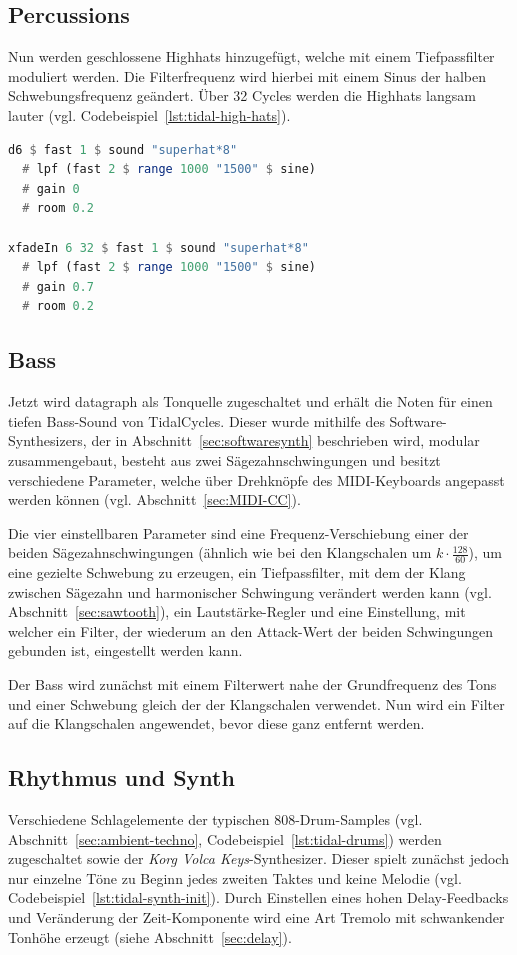 \subsection{Percussions}
Nun werden geschlossene Highhats hinzugefügt, welche mit einem Tiefpassfilter moduliert werden. Die Filterfrequenz wird hierbei mit einem Sinus der halben Schwebungsfrequenz geändert. Über 32 Cycles werden die Highhats langsam lauter (vgl. Codebeispiel~\ref{lst:tidal-high-hats}).

\begin{lstlisting}[language=Haskell, caption={fadeIn der Highhats}, label={lst:tidal-high-hats}]
d6 $ fast 1 $ sound "superhat*8" 
  # lpf (fast 2 $ range 1000 "1500" $ sine)
  # gain 0
  # room 0.2

xfadeIn 6 32 $ fast 1 $ sound "superhat*8" 
  # lpf (fast 2 $ range 1000 "1500" $ sine)
  # gain 0.7
  # room 0.2
\end{lstlisting}

\subsection{Bass}
Jetzt wird datagraph als Tonquelle zugeschaltet und erhält die Noten für einen tiefen Bass-Sound von TidalCycles. Dieser wurde mithilfe des Software-Synthesizers, der in Abschnitt~\ref{sec:softwaresynth} beschrieben wird, modular zusammengebaut, besteht aus zwei Sägezahnschwingungen und besitzt verschiedene Parameter, welche über Drehknöpfe des MIDI-Keyboards angepasst werden können (vgl. Abschnitt~\ref{sec:MIDI-CC}).

Die vier einstellbaren Parameter sind eine Frequenz-Verschiebung einer der beiden Sägezahnschwingungen (ähnlich wie bei den Klangschalen um $k \cdot \frac{128}{60}$), um eine gezielte Schwebung zu erzeugen, ein Tiefpassfilter, mit dem der Klang zwischen Sägezahn und harmonischer Schwingung verändert werden kann (vgl. Abschnitt~\ref{sec:sawtooth}), ein Lautstärke-Regler und eine Einstellung, mit welcher ein Filter, der wiederum an den Attack-Wert der beiden Schwingungen gebunden ist, eingestellt werden kann.

Der Bass wird zunächst mit einem Filterwert nahe der Grundfrequenz des Tons und einer Schwebung gleich der der Klangschalen verwendet. Nun wird ein Filter auf die Klangschalen angewendet, bevor diese ganz entfernt werden.

\subsection{Rhythmus und Synth}
Verschiedene Schlagelemente der typischen 808-Drum-Samples (vgl. Abschnitt~\ref{sec:ambient-techno}, Codebeispiel~\ref{lst:tidal-drums}) werden zugeschaltet sowie der \textit{Korg Volca Keys}-Synthesizer. Dieser spielt zunächst jedoch nur einzelne Töne zu Beginn jedes zweiten Taktes und keine Melodie (vgl. Codebeispiel~\ref{lst:tidal-synth-init}). Durch Einstellen eines hohen Delay-Feedbacks und Veränderung der Zeit-Komponente wird eine Art Tremolo mit schwankender Tonhöhe erzeugt (siehe Abschnitt~\ref{sec:delay}).

